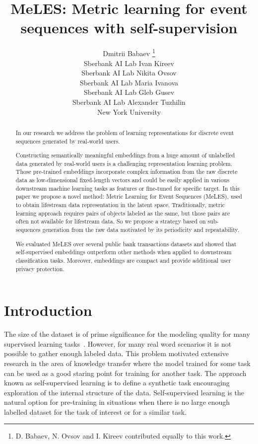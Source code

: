 \documentclass{article}
\title{MeLES: Metric learning for event sequences with self-supervision}
\author{
Dmitrii Babaev \thanks{D. Babaev, N. Ovsov and I. Kireev contributed equally to this work.} \\
Sberbank AI Lab
\And
Ivan Kireev \\
Sberbank AI Lab
\And
Nikita Ovsov \\
Sberbank AI Lab
\And
Maria Ivanova \\
Sberbank AI Lab
\And
Gleb Gusev \\
Sberbank AI Lab
\And
Alexander Tuzhilin \\
New York University
}
\begin{document}
\maketitle

\begin{abstract}

In our research we address the problem of learning representations for discrete event sequences generated by real-world users.

Constructing semantically meaningful embeddings from a huge amount of unlabelled data generated by real-world users is a challenging representation learning problem. Those pre-trained embeddings incorporate complex information from the raw discrete data as low-dimensional fixed-length vectors and could be easily applied in various downstream machine learning tasks as features or fine-tuned for specific target. In this paper we propose a novel method: Metric Learning for Event Sequences (MeLES), used to obtain lifestream data representation in the latent space. Traditionally, metric learning approach requires pairs of objects labeled as the same, but those pairs are often not available for lifestream data. So we propose a strategy based on sub-sequences generation from the raw data motivated by its periodicity and repeatability.

We evaluated MeLES over several public bank transactions datasets and showed that self-supervised embeddings outperform other methods when applied to downstream classification tasks. Moreover, embeddings are compact and provide additional user privacy protection.

\end{abstract}

\section{Introduction} \label{sec-intro}

The size of the dataset is of prime significance for the modeling quality for many supervised learning tasks~\cite{Sun2017RevisitingUE}. However, for many real word scenarios it is not possible to gather enough labeled data. This problem motivated extensive research in the area of knowledge transfer where the model trained for some task can be used as a good staring point for training for another task. The approach known as self-supervised learning is to define a synthetic task encouraging exploration of the internal structure of the data. Self-supervised learning is the natural option for pre-training in situations when there is no large enough labelled dataset for the task of interest or for a similar task.
\end{document}

